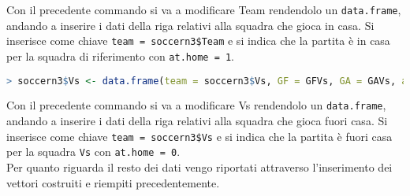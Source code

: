 \bigskip
Con il precedente commando si va a modificare \textsf{Team} rendendolo un \texttt{data.frame}, andando a inserire i dati della riga relativi alla squadra che gioca in casa. Si inserisce come chiave \texttt{team = soccern3\$Team} e si indica che la partita è in casa per la squadra di riferimento con \texttt{at.home = 1}.
\bigskip
\bigskip
\begin{lstlisting}[language=R]
> soccern3$Vs <- data.frame(team = soccern3$Vs, GF = GFVs, GA = GAVs, at.home = 0, Poss = PossVs, Sh = ShVs, SoT = ShTVs, G.Sh = G.ShVs, PAtt = PAttVs, PCmp. = PCmp.Vs, SPAtt = SPAttVs, SPCmp. = SPCmp.Vs, MPAtt = MPAttVs, MPCmp. = MPCmp.Vs, LPAtt = LPAttVs, LPCmp. = LPCmp.Vs, ToDef3rd = ToDef3rdVs, ToAtt3rd = ToAtt3rdVs, ToAttPen = ToAttPenVs, TotDist = ToDistVs, Fls = FlsVs, Fld = FldVs, Crs = CrsVs, Int = IntVs, TklWin = TklWinVs, Recov = RecovVs)
\end{lstlisting}
\bigskip
Con il precedente commando si va a modificare \textsf{Vs} rendendolo un \texttt{data.frame}, andando a inserire i dati della riga relativi alla squadra che gioca fuori casa. Si inserisce come chiave \texttt{team = soccern3\$Vs} e si indica che la partita è fuori casa per la squadra \texttt{Vs} con \texttt{at.home = 0}.\\ Per quanto riguarda il resto dei dati vengo riportati attraverso l'inserimento dei vettori costruiti e riempiti precedentemente.\\
